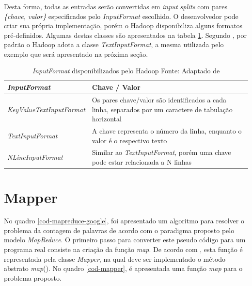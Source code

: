 Desta forma, todas as entradas serão convertidas em \textit{input splits} com pares \textit{\{chave, valor\}} especificados pelo \textit{InputFormat} escolhido. O desenvolvedor pode criar sua própria implementação, porém o Hadoop disponibiliza alguns formatos pré-definidos. Algumas destas classes são apresentados na tabela \ref{tab-inputformat}. Segundo , por padrão o Hadoop adota a classe \textit{TextInputFormat}, a mesma utilizada pelo exemplo que será apresentado na próxima seção.

\begin{table}[!ht]
\begin{center}
  \begin{tabular}{|p{5cm}|p{5cm}|}
	\hline
	\textit{InputFormat} & Chave / Valor	
	\\ \hline
	\textit{KeyValueTextInputFormat} & Os pares chave/valor são identificados a cada linha, separados por um caractere de tabulação horizontal
	\\ \hline
	\textit{TextInputFormat} & A chave representa o número da linha, enquanto o valor é o respectivo texto
	\\ \hline
	\textit{NLineInputFormat} & Similar ao \textit{TextInputFormat}, porém uma chave pode estar relacionada a N linhas
	\\ \hline
  \end{tabular}
  \captionsetup{justification=centering}
  \caption[\textit{InputFormat} disponibilizados pelo Hadoop]{\textit{InputFormat} disponibilizados pelo Hadoop
  \protect\linebreak Fonte: Adaptado de \cite{venner2009}}
\label{tab-inputformat}
\end{center}
\end{table}
\FloatBarrier

\section{Mapper}

No quadro \ref{cod-mapreduce-google}, foi apresentado um algoritmo para resolver o problema da contagem de palavras de acordo com o paradigma proposto pelo modelo \textit{MapReduce}. O primeiro passo para converter este pseudo código para um programa real consiste na criação da função \textit{map}. De acordo com , esta função é representada pela classe \textit{Mapper}, na qual deve ser implementado o método abstrato \textit{map}(). No quadro \ref{cod-mapper}, é apresentada uma função \textit{map} para o problema proposto.


